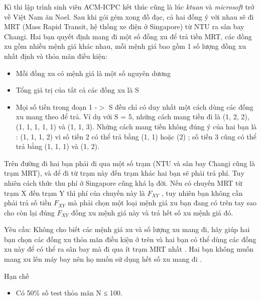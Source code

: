 Kì thi lập trình sinh viên ACM-ICPC kết thúc cũng là lúc   \textit{    ktuan   }   và   \textit{    microsoft   }   trở về Việt Nam ăn Noel. Sau khi gói gém xong đồ đạc, cả hai đồng ý với nhau sẽ đi MRT (Mass Rapid Transit, hệ thống xe điện ở Singapore) từ NTU ra sân bay Changi. Hai bạn quyết định mang đi một số đồng xu để trả tiền MRT, các đồng xu gồm nhiều mệnh giá khác nhau, mỗi mệnh giá bao gồm 1 số lượng đồng xu nhất định và thỏa mãn điều kiện:  
\begin{itemize}
	\item     Mỗi đồng xu có mệnh giá là một số nguyên dương   
	\item     Tổng giá trị của tất cả các đồng xu là S   
	\item     Mọi số tiền trong đoạn 1 -$>$ S đều chỉ có duy nhất một cách dùng các đồng xu mang theo để trả. Ví dụ với S = 5, những cách mang tiền đi là (1, 2, 2), (1, 1, 1, 1, 1) và (1, 1, 3). Những cách mang tiền không đúng ý của hai bạn là : (1, 1, 1, 2) vì số tiền 2 có thể trả bằng (1, 1) hoặc (2) ; số tiền 3 cũng có thể trả bằng (1, 1, 1) và (1, 2).   
\end{itemize}

   Trên đường đi hai bạn phải đi qua một số trạm (NTU và sân bay Changi cũng là trạm MRT), và để đi từ trạm này đến trạm khác hai bạn sẽ phải trả phí. Tuy nhiên cách thức thu phí ở Singapore cũng khá lạ đời. Nếu có chuyến MRT từ trạm X đến trạm Y thì phí của chuyến này là $F_{XY}$   , tuy nhiên bạn không cần phải trả số tiền $F_{XY}$   mà       phải chọn một loại mệnh giá xu         bạn đang có        trên tay sao cho còn lại đúng $F_{XY}$    đồng xu mệnh giá này và trả hết số xu mệnh giá đó.     

       Yêu cầu:      Không cho biết các mệnh giá xu và số lượng xu mang đi, hãy giúp hai bạn chọn các đồng xu       thỏa mãn điều kiện ở trên      và hai bạn có thể dùng các đồng xu này để       có thể ra sân bay      mà       đi qua ít trạm MRT nhất      . Hai bạn không muốn mang xu lên máy bay nên họ muốn       sử dụng hết số xu mang đi      .  

Hạn chế
\begin{itemize}
	\item     Có 50\% số test thỏa mãn N ≤ 100.   
\end{itemize}